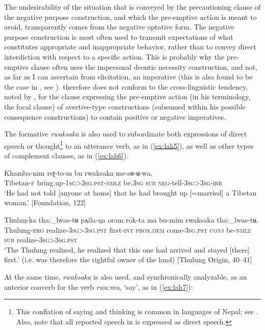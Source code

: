 \documentclass[output=paper,colorlinks,citecolor=brown]{langscibook}
\begin{document}
The undesirability of the situation that is conveyed by the precautioning clause of the negative purpose construction, and which the pre-emptive action is meant to avoid, transparently comes from the negative optative form. The negative purpose construction is most often used to transmit expectations of what constitutes appropriate and inappropriate behavior, rather than to convey direct interdiction with respect to a specific action. This is probably why the pre-emptive clause often uses the impersonal deontic necessity construction, and not, as far as I can ascertain from elicitation, an imperative (this is also found to be the case in , see \citealt{chapters/lovick}).  therefore does not conform to the cross-linguistic tendency, noted by \citet[24]{dixon2009}, for the clause expressing the pre-emptive action (in his terminology, the focal clause) of avertive-type constructions (subsumed within his possible consequence constructions) to contain positive or negative imperatives.

The formative \textit{rwaksaka} is also used to subordinate both expressions of direct speech or thought\footnote{This conflation of saying and thinking is common in languages of Nepal; see \citet{Noonan2006}. Also, note that all reported speech in  is expressed as direct speech.} to an utterance verb, as in (\ref{ex:lah5}), as well as other types of complement clauses, as in (\ref{ex:lah6}).

\ea
\label{ex:lah5}
\gll Khamba-nim reʈ-to-m bu rwaksaka me-sɵ-ʉ-wa. \\
Tibetan-\textsc{f} bring.up-\textsc{1sg>3sg.pst-nmlz} be.\textsc{3sg} \textsc{sub} \textsc{neg-}tell-\textsc{3sg>3sg-irr} \\
\glt `He had not told [anyone at home] that he had brought up [=married] a Tibetan woman.' [Foundation, 122]
\z

 
\ea \label{ex:lah6}
\gll Thuluŋ-ka tha:\_lwas-tʉ pʌila-ŋa oram rok-ta ma bu-mim rwaksaka tha:\_lwas-tʉ. \\
Thulung-\textsc{erg} realize-\textsc{3sg>3sg.pst} first-\textsc{int} \textsc{prox.dem} come-\textsc{3sg.pst} \textsc{conj} be-\textsc{nmlz} \textsc{sub} realize-\textsc{3sg>3sg.pst} \\
\glt `The Thulung realized, he realized that this one had arrived and stayed [there] first.' (i.e. was therefore the rightful owner of the land) [Thulung Origin, 40--41]
\z

\largerpage
 At the same time, \textit{rwaksaka} is also used, and synchronically analyzable, as an anterior converb for the verb \textit{rwa:mu}, `say', as in (\ref{ex:lah7}):
\end{document}

